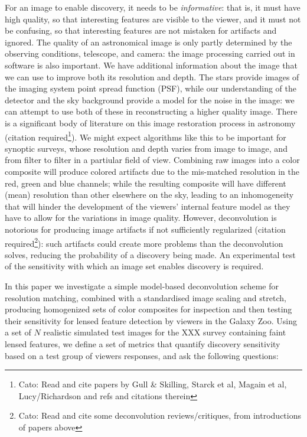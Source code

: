 \documentclass[letterpaper, 11pt]{article}
\begin{document}
For an image to enable discovery, it needs to be {\it informative}: that is,
it must have high quality, so that interesting features are visible to the
viewer, and it must not be confusing, so that interesting features are not
mistaken for artifacts and ignored. The quality of an astronomical image is
only partly determined by the observing conditions, telescope, and camera: the
image processing carried out in software is also important. We have additional
information about the image that we can use to improve both its resolution and
depth. The stars provide images of the imaging system point spread function
(PSF), while our understanding of the detector and the sky background provide
a model for the noise in the image: we can attempt to use both of these in
reconstructing a higher quality image. There is a significant body of
literature on this image restoration process in astronomy (citation
required\footnote{Cato: Read and cite papers by Gull \& Skilling, Starck et
al, Magain et al, Lucy/Richardson and refs and citations therein}). We might
expect algorithms like this to be important for synoptic surveys, whose
resolution and depth varies from image to image, and from filter to filter in
a partiular field of view. Combining raw images into a color composite will
produce colored artifacts due to the mis-matched resolution in the red, green
and blue channels; while the resulting composite will have different (mean)
resolution than other elsewhere on the sky, leading to an inhomogeneity that
will hinder the development of the viewers' internal feature model as they
have to allow for the variations in image quality. However, deconvolution is
notorious for producing image artifacts if not sufficiently regularized
(citation required\footnote{Cato: Read and cite some deconvolution
reviews/critiques, from introductions of papers above}): such artifacts could
create more problems than the deconvolution solves, reducing the probability
of a discovery being made.  An experimental test of the sensitivity with which
an image set enables discovery is required.

In this paper we investigate a simple model-based deconvolution scheme for
resolution matching, combined with a standardised image scaling and stretch,
producing homogenized sets of color composites for inspection and then testing
their sensitivity for lensed feature detection by viewers in the Galaxy Zoo.
Using a set of $N$ realistic simulated test images for the XXX survey 
containing faint lensed features, we define a set of metrics that quantify
discovery sensitivity based on a test group of viewers responses, and 
ask the following questions:
\end{document}
